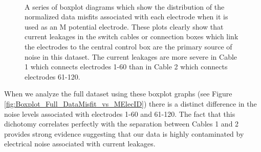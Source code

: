 \documentclass[final,authoryear,5p,times,twocolumn]{elsarticle}
\begin{document}
\begin{figure} [!ht]
\begin{center}
{       } \\%
    \end{center}
\caption{A series of boxplot diagrams which show the distribution of the normalized data misfits associated with each electrode when it is used as an M potential electrode. These plots clearly show that current leakages in the switch cables or connection boxes which link the electrodes to the central control box are the primary source of noise in this dataset. The current leakages are more severe in Cable 1 which connects electrodes 1-60 than in Cable 2 which connects electrodes 61-120.}
\label{fig:Boxplot_Misfit_vs_M_ElecID}
\end{figure}

When we analyze the full dataset using these boxplot graphs (see Figure \ref{fig:Boxplot_Full_DataMisfit_vs_MElecID}) there is a distinct difference in the noise levels associated with electrodes 1-60 and 61-120. The fact that this dichotomy correlates perfectly with the separation between Cables 1 and 2 provides strong evidence suggesting that our data is highly contaminated by electrical noise associated with current leakages.
\end{document}
